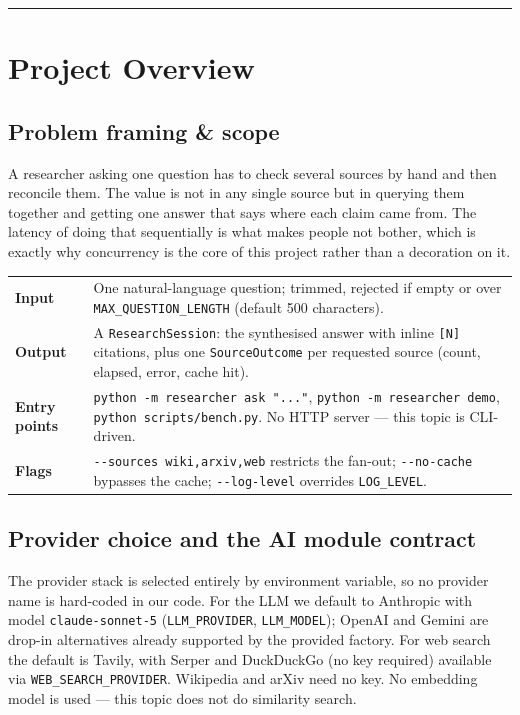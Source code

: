 \documentclass[11pt,a4paper]{article}
\begin{document}
\tableofcontents
\vspace{0.6em}\hrule\vspace{0.4em}

\section{Project Overview}

\subsection{Problem framing \& scope}

A researcher asking one question has to check several sources by hand and then reconcile them. The
value is not in any single source but in querying them together and getting one answer that says
where each claim came from. The latency of doing that sequentially is what makes people not bother,
which is exactly why concurrency is the core of this project rather than a decoration on it.

\begin{tabularx}{\textwidth}{@{}lX@{}}
\toprule
\textbf{Input} & One natural-language question; trimmed, rejected if empty or over
\texttt{MAX\_QUESTION\_LENGTH} (default 500 characters). \\
\addlinespace
\textbf{Output} & A \texttt{ResearchSession}: the synthesised answer with inline \texttt{[N]}
citations, plus one \texttt{SourceOutcome} per requested source (count, elapsed, error, cache hit). \\
\addlinespace
\textbf{Entry points} & \texttt{python -m researcher ask "..."}, \texttt{python -m researcher demo},
\texttt{python scripts/bench.py}. No HTTP server --- this topic is CLI-driven. \\
\addlinespace
\textbf{Flags} & \texttt{-{}-sources wiki,arxiv,web} restricts the fan-out;
\texttt{-{}-no-cache} bypasses the cache; \texttt{-{}-log-level} overrides \texttt{LOG\_LEVEL}. \\
\bottomrule
\end{tabularx}

\subsection{Provider choice and the AI module contract}

The provider stack is selected entirely by environment variable, so no provider name is hard-coded
in our code. For the LLM we default to Anthropic with model \texttt{claude-sonnet-5}
(\texttt{LLM\_PROVIDER}, \texttt{LLM\_MODEL}); OpenAI and Gemini are drop-in alternatives already
supported by the provided factory. For web search the default is Tavily, with Serper and DuckDuckGo
(no key required) available via \texttt{WEB\_SEARCH\_PROVIDER}. Wikipedia and arXiv need no key. No
embedding model is used --- this topic does not do similarity search.
\end{document}
